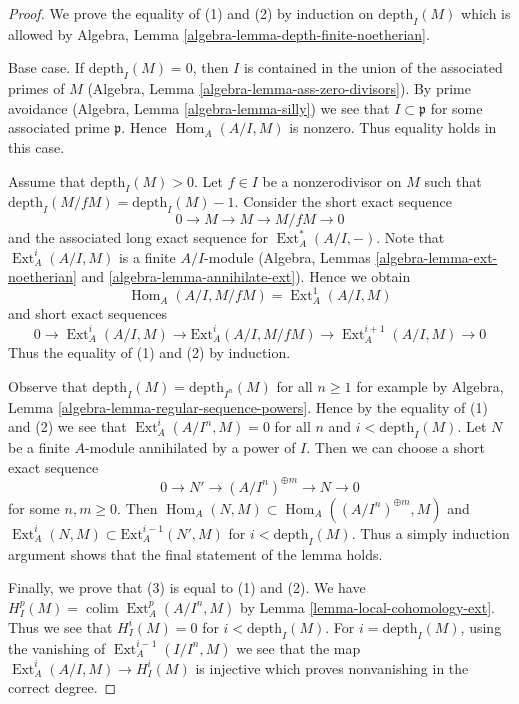 \documentclass[10pt,a4paper]{amsart}
\theoremstyle{plain}
\theoremstyle{definition}
\theoremstyle{remark}
\numberwithin{equation}{subsection}
\def\colim{\mathop{\mathrm{colim}}\nolimits}
\def\Hom{\mathop{\mathrm{Hom}}\nolimits}
\def\Ext{\mathop{\mathrm{Ext}}\nolimits}
\begin{document}
\begin{proof}
We prove the equality of (1) and (2) by induction on $\text{depth}_I(M)$
which is allowed by
Algebra, Lemma \ref{algebra-lemma-depth-finite-noetherian}.

\medskip\noindent
Base case. If $\text{depth}_I(M) = 0$, then $I$ is contained in the union
of the associated primes of $M$
(Algebra, Lemma \ref{algebra-lemma-ass-zero-divisors}).
By prime avoidance (Algebra, Lemma \ref{algebra-lemma-silly})
we see that $I \subset \mathfrak p$ for some associated prime $\mathfrak p$.
Hence $\Hom_A(A/I, M)$
is nonzero. Thus equality holds in this case.

\medskip\noindent
Assume that $\text{depth}_I(M) > 0$. Let $f \in I$ be a nonzerodivisor
on $M$ such that $\text{depth}_I(M/fM) = \text{depth}_I(M) - 1$.
Consider the short exact sequence
$$
0 \to M \to M \to M/fM \to 0
$$
and the associated long exact sequence for $\Ext^*_A(A/I, -)$.
Note that $\Ext^i_A(A/I, M)$ is a finite $A/I$-module
(Algebra, Lemmas \ref{algebra-lemma-ext-noetherian} and
\ref{algebra-lemma-annihilate-ext}). Hence we obtain
$$
\Hom_A(A/I, M/fM) = \Ext^1_A(A/I, M)
$$
and short exact sequences
$$
0 \to \Ext^i_A(A/I, M) \to \text{Ext}^i_A(A/I, M/fM) \to
\Ext^{i + 1}_A(A/I, M) \to 0
$$
Thus the equality of (1) and (2) by induction.

\medskip\noindent
Observe that $\text{depth}_I(M) = \text{depth}_{I^n}(M)$ for all $n \geq 1$
for example by Algebra, Lemma \ref{algebra-lemma-regular-sequence-powers}.
Hence by the equality of (1) and (2) we see that
$\Ext^i_A(A/I^n, M) = 0$ for all $n$ and $i < \text{depth}_I(M)$.
Let $N$ be a finite $A$-module annihilated by a power of $I$.
Then we can choose a short exact sequence
$$
0 \to N' \to (A/I^n)^{\oplus m} \to N \to 0
$$
for some $n, m \geq 0$. Then
$\Hom_A(N, M) \subset \Hom_A((A/I^n)^{\oplus m}, M)$
and
$\Ext^i_A(N, M) \subset \text{Ext}^{i - 1}_A(N', M)$
for $i < \text{depth}_I(M)$. Thus a simply induction argument
shows that the final statement of the lemma holds.

\medskip\noindent
Finally, we prove that (3) is equal to (1) and (2).
We have $H^p_I(M) = \colim \Ext^p_A(A/I^n, M)$ by
Lemma \ref{lemma-local-cohomology-ext}.
Thus we see that $H^i_I(M) = 0$ for $i < \text{depth}_I(M)$.
For $i = \text{depth}_I(M)$, using the vanishing of
$\Ext_A^{i - 1}(I/I^n, M)$ we see that the map
$\Ext_A^i(A/I, M) \to H_I^i(M)$ is injective which
proves nonvanishing in the correct degree.
\end{proof}
\end{document}
